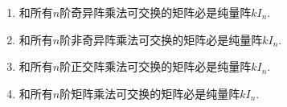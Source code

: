 \documentclass[lang=cn,newtx,10pt,scheme=chinese]{elegantbook}
\begin{document}
\begin{proposition}[纯量矩阵的刻画]\label{proposition:纯量阵的刻画}
\begin{enumerate}[(1)]
    \item 和所有\(n\)阶奇异阵乘法可交换的矩阵必是纯量阵\(kI_{n}\).
    
    \item 和所有\(n\)阶非奇异阵乘法可交换的矩阵必是纯量阵\(kI_{n}\).
    
    \item 和所有\(n\)阶正交阵乘法可交换的矩阵必是纯量阵\(kI_{n}\).
    
    \item 和所有\(n\)阶矩阵乘法可交换的矩阵必是纯量阵\(kI_{n}\).
\end{enumerate}
    
\end{proposition}
\end{document}
